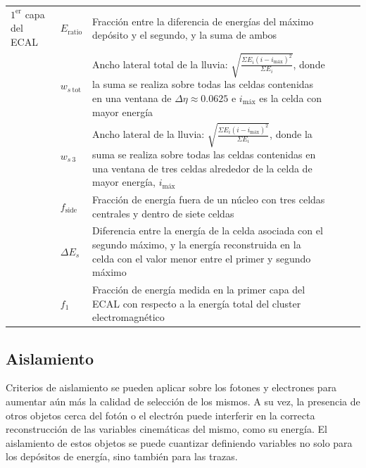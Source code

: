 \begin{table}
\begin{tabular}{ p{2.1cm} l p{8cm} c c c}
		\hline

		$1^{\text{er}}$ capa del ECAL & $E_{\text{ratio}}$ & Fracción entre la diferencia de energías del máximo depósito y el segundo, y la suma de ambos & \xmark & \cmark & \cmark \\

		 & $w_{s\:\text{tot}}$ & Ancho lateral total de la lluvia: $\sqrt{\frac{\Sigma E_{i}(i-i_{\text{máx}})^{2}}{\Sigma E_{i}}}$, donde la suma se realiza sobre todas las celdas contenidas en una ventana de $\Delta\eta\approx0.0625$ e $i_{\text{máx}}$ es la celda con mayor energía & \xmark & \xmark & \cmark \\

		 & $w_{s\:\text{3}}$ & Ancho lateral de la lluvia: $\sqrt{\frac{\Sigma E_{i}(i-i_{\text{máx}})^{2}}{\Sigma E_{i}}}$, donde la suma se realiza sobre todas las celdas contenidas en una ventana de tres celdas alrededor de la celda de mayor energía, $i_{\text{máx}}$ & \xmark & \xmark & \cmark \\

		 & $f_{\text{side}}$ & Fracción de energía fuera de un núcleo con tres celdas centrales y dentro de siete celdas & \xmark & \xmark & \cmark \\

		 & $\Delta E_{s}$ & Diferencia entre la energía de la celda asociada con el segundo máximo, y la energía reconstruida en la celda con el valor menor entre el primer y segundo máximo & \xmark & \xmark & \cmark \\

		 & $f_{\text{1}}$ & Fracción de energía medida en la primer capa del ECAL con respecto a la energía total del cluster electromagnético & \xmark & \xmark & \cmark \\

     \hline
     \hline

	\end{tabular}

\label{tab:phIDVars}
\end{table}




\subsection{Aislamiento}

Criterios de aislamiento se pueden aplicar sobre los fotones y electrones para aumentar aún más la calidad de selección de los mismos. A su vez, la presencia de otros objetos cerca del fotón o el electrón puede interferir en la correcta reconstrucción de las variables cinemáticas del mismo, como su energía. El aislamiento de estos objetos se puede cuantizar definiendo variables no solo para los depósitos de energía, sino también para las trazas.

